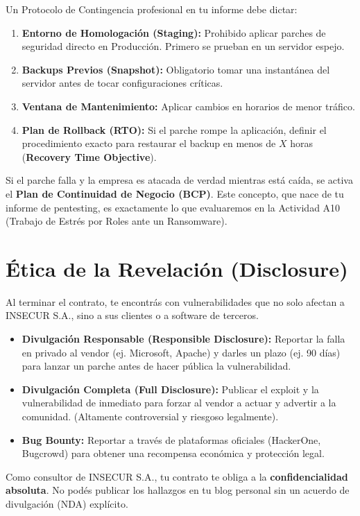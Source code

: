 \documentclass[11pt,a4paper]{article}
\begin{document}
Un Protocolo de Contingencia profesional en tu informe debe dictar:
\begin{enumerate}[leftmargin=*]
  \item \textbf{Entorno de Homologación (Staging):} Prohibido aplicar parches de seguridad directo en Producción. Primero se prueban en un servidor espejo.
  \item \textbf{Backups Previos (Snapshot):} Obligatorio tomar una instantánea del servidor antes de tocar configuraciones críticas.
  \item \textbf{Ventana de Mantenimiento:} Aplicar cambios en horarios de menor tráfico.
  \item \textbf{Plan de Rollback (RTO):} Si el parche rompe la aplicación, definir el procedimiento exacto para restaurar el backup en menos de $X$ horas (\textbf{Recovery Time Objective}).
\end{enumerate}

\begin{reflexion}
Si el parche falla y la empresa es atacada de verdad mientras está caída, se activa el \textbf{Plan de Continuidad de Negocio (BCP)}. Este concepto, que nace de tu informe de pentesting, es exactamente lo que evaluaremos en la Actividad A10 (Trabajo de Estrés por Roles ante un Ransomware).
\end{reflexion}

\section{Ética de la Revelación (Disclosure)}
Al terminar el contrato, te encontrás con vulnerabilidades que no solo afectan a INSECUR S.A., sino a sus clientes o a software de terceros.

\begin{alerta}
\begin{itemize}[leftmargin=*]
  \item \textbf{Divulgación Responsable (Responsible Disclosure):} Reportar la falla en privado al vendor (ej. Microsoft, Apache) y darles un plazo (ej. 90 días) para lanzar un parche antes de hacer pública la vulnerabilidad.
  \item \textbf{Divulgación Completa (Full Disclosure):} Publicar el exploit y la vulnerabilidad de inmediato para forzar al vendor a actuar y advertir a la comunidad. (Altamente controversial y riesgoso legalmente).
  \item \textbf{Bug Bounty:} Reportar a través de plataformas oficiales (HackerOne, Bugcrowd) para obtener una recompensa económica y protección legal.
\end{itemize}
Como consultor de INSECUR S.A., tu contrato te obliga a la \textbf{confidencialidad absoluta}. No podés publicar los hallazgos en tu blog personal sin un acuerdo de divulgación (NDA) explícito.
\end{alerta}
\end{document}
